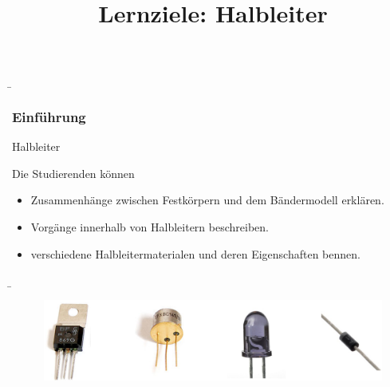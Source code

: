 \begin{frame}
    \b{ \frametitle{Einführung}
        \begin{Lernziele}{Halbleiter}
            \title{Lernziele: Halbleiter}
            Die Studierenden können
            \begin{itemize}
                \item Zusammenhänge zwischen Festkörpern und dem Bändermodell erklären.
                \item Vorgänge innerhalb von Halbleitern beschreiben.
                \item verschiedene Halbleitermaterialen und deren Eigenschaften bennen.
            \end{itemize}
            \end{Lernziele}   
    }
\end{frame}

\begin{frame}
     \b{
     \begin{figure}[H]
        \centering
        \includegraphics[width=.8\textwidth]{Bilder/kap1/AufnahmenHalbleiterWiki.png}
    \end{figure}
     }
\end{frame}

